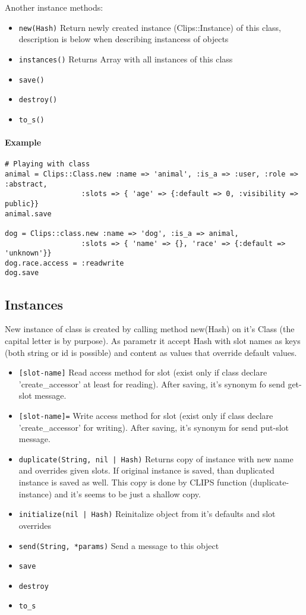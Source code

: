 \documentclass[a4paper,10pt]{article}
\begin{document}
Another instance methods:
\begin{itemize}
 \item \texttt{new(Hash)} Return newly created instance (Clips::Instance) of this class, description is below when describing instancess of objects
 \item \texttt{instances()} Returns Array with all instances of this class
 \item \texttt{save()}
 \item \texttt{destroy()}
 \item \texttt{to\_s()}
\end{itemize}

\paragraph{Example}
\begin{verbatim}
# Playing with class
animal = Clips::Class.new :name => 'animal', :is_a => :user, :role => :abstract, 
                  :slots => { 'age' => {:default => 0, :visibility => public}}
animal.save

dog = Clips::class.new :name => 'dog', :is_a => animal,
                  :slots => { 'name' => {}, 'race' => {:default => 'unknown'}}
dog.race.access = :readwrite
dog.save
\end{verbatim}

\subsection{Instances}
New instance of class is created by calling method new(Hash) on it's Class (the capital letter is by purpose). As parametr it accept Hash with slot names as keys (both string or id is possible) and content as values that override default values.

\begin{itemize}
 \item \texttt{[slot-name]} Read access method for slot (exist only if class declare 'create\_accessor' at least for reading). After saving, it's synonym fo send get-slot message.
 \item \texttt{[slot-name]=} Write access method for slot (exist only if class declare 'create\_accessor' for writing). After saving, it's synonym for send put-slot message.
 \item \texttt{duplicate(String, nil | Hash)} Returns copy of  instance with new name and overrides given slots. If original instance is saved, than duplicated instance is saved as well. This copy is done by CLIPS function (duplicate-instance) and it's seems to be just a shallow copy.
 \item \texttt{initialize(nil | Hash)} Reinitalize object from it's defaults and slot overrides
 \item \texttt{send(String, *params)} Send a message to this object
 \item \texttt{save}
 \item \texttt{destroy}
 \item \texttt{to\_s}
\end{itemize}
\end{document}
